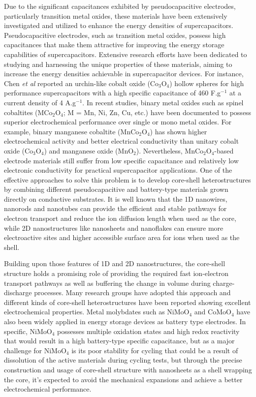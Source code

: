 \documentclass[reprint,amsmath,amssymb,aps,floatfix,
]{revtex4-2}
\begin{document}
Due to the significant capacitances exhibited by pseudocapacitive electrodes, particularly transition metal oxides, these materials have been extensively investigated and utilized to enhance the energy densities of supercapacitors.
Pseudocapacitive electrodes, such as transition metal oxides, possess high capacitances that make them attractive for improving the energy storage capabilities of supercapacitors. Extensive research efforts have been dedicated to studying and harnessing the unique properties of these materials, aiming to increase the energy densities achievable in supercapacitor devices. For instance, Chen {\it et al} reported an urchin-like cobalt oxide (Co$_3$O$_4$) hollow spheres for high performance supercapacitors with a high specific capacitance of 460 F.g$^{-1}$ at a current density of 4 A.g$^{-1}$.\cite{Fashen2016} In recent studies, binary metal oxides such as spinel cobaltites (MCo$_2$O$_4$; M = Mn, Ni, Zn, Cu, etc.) have been documented to possess superior electrochemical performance over single or mono metal oxides.\cite{Qiufan2012} For example, binary manganese cobaltite (MnCo$_2$O$_4$) has shown higher electrochemical activity and better electrical conductivity than unitary cobalt oxide (Co$_3$O$_4$) and manganese oxide (MnO$_2$). Nevertheless, MnCo$_2$O$_4$-based electrode materials still suffer from low specific capacitance and relatively low electronic conductivity for practical supercapacitor applications. One of the effective approaches to solve this problem is to develop core-shell heterostructures by combining different pseudocapacitive and battery-type materials grown directly on conductive substrates.\cite{Lin2017} It is well known that the 1D nanowires, nanorods and nanotubes can provide the efficient and stable pathways for electron transport and reduce the ion diffusion length when used as the core,\cite{Jinghuang2017} while 2D nanostructures like nanosheets and nanoflakes can ensure more electroactive sites and higher accessible surface area for ions when used as the shell.\cite{Daoping2014}

Building upon those features of 1D and 2D nanostructures, the core-shell structure holds a promising role of providing the required fast ion-electron transport pathways as well as buffering the change in volume during charge-discharge processes. Many research groups have adopted this approach and different kinds of core-shell heterostructures have been reported showing excellent electrochemical properties.\cite{Yan2017} Metal molybdates such as NiMoO$_4$ and CoMoO$_4$ have also been widely applied in energy storage devices as battery type electrodes.\cite{Xiao2009} In specific, NiMoO$_4$ possesses multiple oxidation states and high redox reactivity that would result in a high battery-type specific capacitance,\cite{Ziqing2016} but as a major challenge for NiMoO$_4$ is its poor stability for cycling that could be a result of dissolution of the active materials during cycling tests, but through the precise construction and usage of core-shell structure with nanosheets as a shell wrapping the core, it's expected to avoid the mechanical expansions and achieve a better electrochemical performance.
\end{document}
